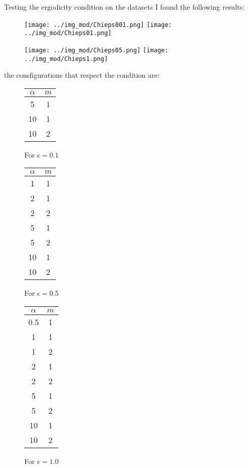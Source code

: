 \documentclass[10pt]{article}
\numberwithin{equation}{section}
\begin{document}
Testing the ergodicity condition on the datasets I found the following results:

\begin{figure}[!htb]
    \texttt{[image: ../img\_mod/Chieps001.png]}
\endminipage \hfill
{}
    \texttt{[image: ../img\_mod/Chieps01.png]}
\endminipage 
\end{figure}

\begin{figure}[!htb]
    \texttt{[image: ../img\_mod/Chieps05.png]}
\endminipage \hfill
{}
    \texttt{[image: ../img\_mod/Chieps1.png]}
\endminipage 
\end{figure}


 the consfigurations that respect the condition are:
\begin{figure}[!htb]

\begin{center}
\begin{tabular}{|c|c|} 
\hline
$\alpha$ & $m$ \\ 
\hline
5 & 1\\
\hline 
10 & 1\\ 
\hline
10 & 2\\ 
\hline
\end{tabular}
\end{center}
\caption{For $\epsilon=0.1$}
\endminipage \hfill
{}
\begin{center}
\begin{tabular}{|c|c|} 
\hline
$\alpha$ & $m$ \\ 
\hline
1 & 1  \\ 
\hline
2 & 1 \\ 
\hline
2 & 2 \\ 
\hline
5 & 1 \\ 
\hline
5 & 2\\ 
\hline
10 & 1\\ 
\hline
10 & 2\\ 
\hline
\end{tabular}
\end{center}
\caption{For $\epsilon=0.5$}
\endminipage \hfill
{}
\begin{center}
\begin{tabular}{|c|c|} 
\hline
$\alpha$ & $m$ \\ 
\hline
0.5 &1\\ 
\hline
1 & 1\\ 
\hline
1 & 2\\ 
\hline
2 & 1\\ 
\hline
2 & 2\\ 
\hline
5 & 1\\ 
\hline
5 & 2\\ 
\hline
10 & 1 \\ 
\hline
10 & 2 \\ 
\hline
\end{tabular}
\end{center}
\caption{For $\epsilon=1.0$}
\endminipage \hfill
\end{figure}
\end{document}
